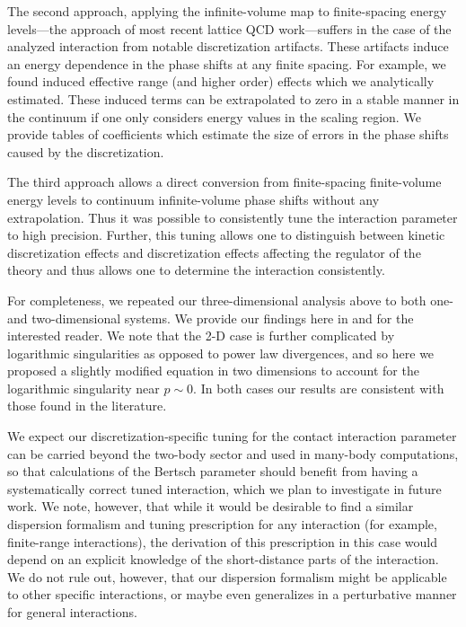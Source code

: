 The second approach, applying the infinite-volume map to finite-spacing energy levels---the approach of most recent lattice QCD work---suffers in the case of the analyzed interaction from notable discretization artifacts.
These artifacts induce an energy dependence in the phase shifts at any finite spacing.
For example, we found induced effective range (and higher order) effects which we analytically estimated.
These induced terms can be extrapolated to zero in a stable manner in the continuum if one only considers energy values in the scaling region.
We provide tables of coefficients which estimate the size of errors in the phase shifts caused by the discretization.

The third approach allows a direct conversion from finite-spacing finite-volume energy levels to continuum infinite-volume phase shifts without any extrapolation.
Thus it was possible to consistently tune the interaction parameter to high precision.
Further, this tuning allows one to distinguish between kinetic discretization effects and discretization effects affecting the regulator of the theory and thus allows one to determine the interaction consistently.

For completeness, we repeated our three-dimensional analysis above to both one- and two-dimensional systems.  We provide our findings here in  and  for the interested reader.
We note that the 2-D case is further complicated by logarithmic singularities as opposed to power law divergences, and so here we proposed a slightly modified \Luscher equation in two dimensions to account for the logarithmic singularity near $p\sim 0$.
In both cases our results are consistent with those found in the literature.

We expect our discretization-specific tuning for the contact interaction parameter can be carried beyond the two-body sector and used in many-body computations, so that calculations of the Bertsch parameter should benefit from having a systematically correct tuned interaction, which we plan to investigate in future work.
We note, however, that while it would be desirable to find a similar dispersion formalism and tuning prescription for any interaction (for example, finite-range interactions), the derivation of this prescription in this case would depend on an explicit knowledge of the short-distance parts of the interaction.
We do not rule out, however, that our dispersion formalism might be applicable to other specific interactions, or maybe even generalizes in a perturbative manner for general interactions.  %

